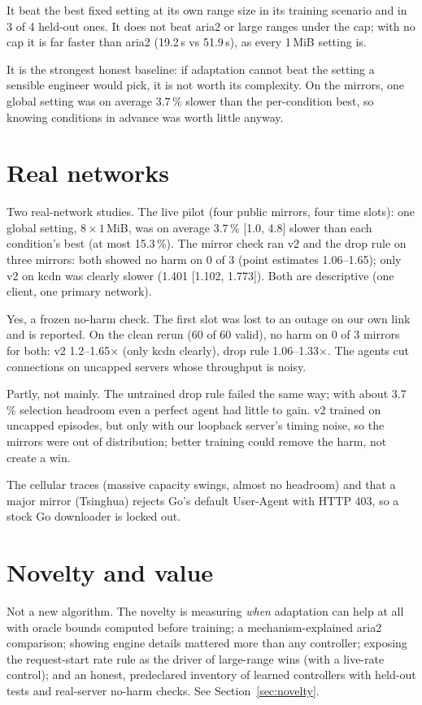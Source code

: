 \A It beat the best fixed setting at its own range size in its training scenario and in 3 of 4 held-out ones. It does not beat aria2 or large ranges under the cap; with no cap it is far faster than aria2 (19.2\,s vs 51.9\,s), as every 1\,MiB setting is.

\A It is the strongest honest baseline: if adaptation cannot beat the setting a sensible engineer would pick, it is not worth its complexity. On the mirrors, one global setting was on average 3.7\,\% slower than the per-condition best, so knowing conditions in advance was worth little anyway.

\section{Real networks}
\A Two real-network studies. The live pilot (four public mirrors, four time slots): one global setting, $8\times1$\,MiB, was on average 3.7\,\% [1.0, 4.8] slower than each condition's best (at most 15.3\,\%). The mirror check ran v2 and the drop rule on three mirrors: both showed no harm on 0 of 3 (point estimates 1.06--1.65); only v2 on kcdn was clearly slower (1.401 [1.102, 1.773]). Both are descriptive (one client, one primary network).

\A Yes, a frozen no-harm check. The first slot was lost to an outage on our own link and is reported. On the clean rerun (60 of 60 valid), no harm on 0 of 3 mirrors for both: v2 1.2--1.65$\times$ (only kcdn clearly), drop rule 1.06--1.33$\times$. The agents cut connections on uncapped servers whose throughput is noisy.

\A Partly, not mainly. The untrained drop rule failed the same way; with about 3.7\,\% selection headroom even a perfect agent had little to gain. v2 trained on uncapped episodes, but only with our loopback server's timing noise, so the mirrors were out of distribution; better training could remove the harm, not create a win.

\A The cellular traces (massive capacity swings, almost no headroom) and that a major mirror (Tsinghua) rejects Go's default User-Agent with HTTP 403, so a stock Go downloader is locked out.

\section{Novelty and value}
\A Not a new algorithm. The novelty is measuring \emph{when} adaptation can help at all with oracle bounds computed before training; a mechanism-explained aria2 comparison; showing engine details mattered more than any controller; exposing the request-start rate rule as the driver of large-range wins (with a live-rate control); and an honest, predeclared inventory of learned controllers with held-out tests and real-server no-harm checks. See Section~\ref{sec:novelty}.

